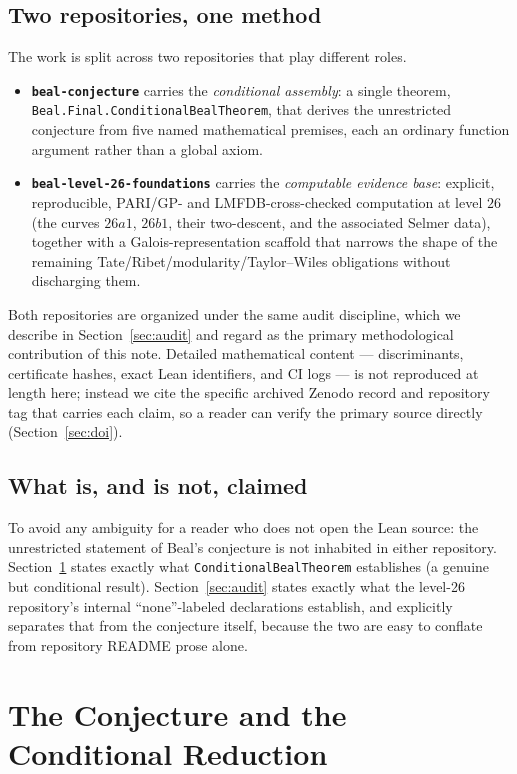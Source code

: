 \documentclass{amsart}
\begin{document}
\subsection{Two repositories, one method}
The work is split across two repositories that play different roles.

\begin{itemize}
  \item \textbf{\texttt{beal-conjecture}} carries the \emph{conditional
  assembly}: a single theorem, \texttt{Beal.Final.ConditionalBealTheorem},
  that derives the unrestricted conjecture from five named mathematical
  premises, each an ordinary function argument rather than a global axiom.
  \item \textbf{\texttt{beal-level-26-foundations}} carries the
  \emph{computable evidence base}: explicit, reproducible, PARI/GP- and
  LMFDB-cross-checked computation at level $26$ (the curves $26a1$,
  $26b1$, their two-descent, and the associated Selmer data), together
  with a Galois-representation scaffold that narrows the shape of the
  remaining Tate/Ribet/modularity/Taylor--Wiles obligations without
  discharging them.
\end{itemize}

Both repositories are organized under the same audit discipline, which we
describe in Section~\ref{sec:audit} and regard as the primary
methodological contribution of this note. Detailed mathematical content
— discriminants, certificate hashes, exact Lean identifiers, and CI logs —
is not reproduced at length here; instead we cite the specific archived
Zenodo record and repository tag that carries each claim, so a reader can
verify the primary source directly (Section~\ref{sec:doi}).

\subsection{What is, and is not, claimed}
To avoid any ambiguity for a reader who does not open the Lean source: the
unrestricted statement of Beal's conjecture is not inhabited in either
repository. Section~\ref{sec:conditional} states exactly what
\texttt{ConditionalBealTheorem} establishes (a genuine but conditional
result). Section~\ref{sec:audit} states exactly what the level-26
repository's internal ``none''-labeled declarations establish, and
explicitly separates that from the conjecture itself, because the two are
easy to conflate from repository README prose alone.

\section{The Conjecture and the Conditional Reduction}
\label{sec:conditional}
\end{document}

